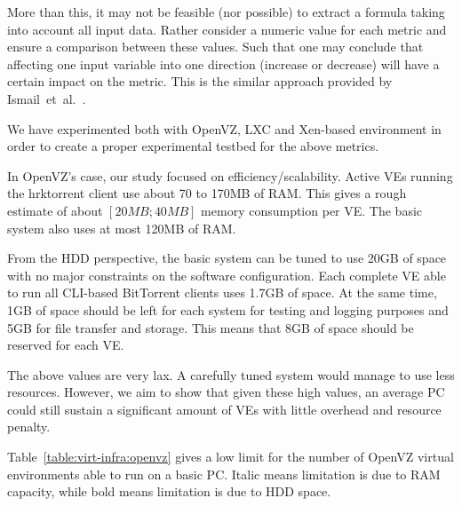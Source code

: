 More than this, it may not be feasible (nor possible) to extract a formula
taking into account all input data. Rather consider a numeric value for each
metric and ensure a comparison between these values. Such that one may
conclude that affecting one input variable into one direction (increase or
decrease) will have a certain impact on the metric. This is the similar
approach provided by Ismail~et~al.~\cite{virt-metrics}.

We have experimented both with OpenVZ, LXC and Xen-based environment in order
to create a proper experimental testbed for the above metrics.

In OpenVZ's case, our study focused on efficiency/scalability. Active VEs
running the hrktorrent client use about 70 to 170MB of RAM. This gives a rough
estimate of about $[20 MB; 40 MB]$ memory consumption per VE. The basic system
also uses at most 120MB of RAM.

From the HDD perspective, the basic system can be tuned to use 20GB of space
with no major constraints on the software configuration. Each complete VE able
to run all CLI-based BitTorrent clients uses 1.7GB of space. At the same time,
1GB of space should be left for each system for testing and logging purposes
and 5GB for file transfer and storage. This means that 8GB of space should be
reserved for each VE.

The above values are very lax. A carefully tuned system would manage to use
less resources. However, we aim to show that given these high values, an
average PC could still sustain a significant amount of VEs with little
overhead and resource penalty.

Table~\ref{table:virt-infra:openvz} gives a low limit for the number of OpenVZ
virtual environments able to run on a basic PC. Italic means limitation is due
to RAM capacity, while bold means limitation is due to HDD space.

